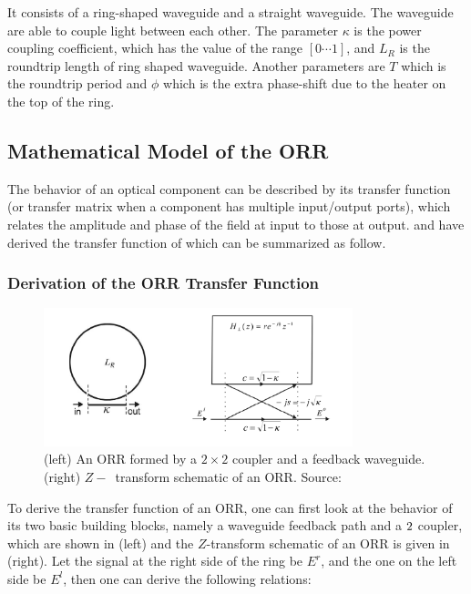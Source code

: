 It consists of a ring-shaped waveguide and a straight waveguide. The waveguide are able to couple light between each other. The parameter $\kappa$ is the power coupling coefficient, which has the value of the range $[0\cdots 1]$, and $L_R$ is the roundtrip length of ring shaped waveguide. Another parameters are $T$ which is the roundtrip period and $\phi$ which is the extra phase-shift due to the heater on the top of the ring. 

\subsection{Mathematical Model of the \ac{ORR}}
The behavior of an optical component can be described by its transfer function (or transfer matrix when a component has multiple input/output ports), which relates the amplitude and phase of the field at input to those at output. \citet{rabus2007integrated} and \citet{zhuang2010ring} have derived the transfer function of which can be summarized as follow.

\subsubsection{Derivation of the ORR Transfer Function}

\begin{figure}[h]
	\centering
	\includegraphics[width=0.8\textwidth]{images/ORR_transferfunction}
	\caption{(left) An ORR formed by a $2 \times 2$ coupler and a feedback waveguide. (right) $Z-$~transform schematic of an ORR. Source: \citep{zhuang2010ring}}
	\label{fig:ORR_transferfunction}
\end{figure}

To derive the transfer function of an ORR, one can first look at the behavior of its two basic building blocks, namely a waveguide feedback path and a $2 \time 2$ coupler, which are shown in  (left) and the $Z$-transform schematic of an ORR is given in  (right). Let the signal at the right side of the ring be $E^r$, and the one on the left side be $E^l$, then one can derive the following relations:

